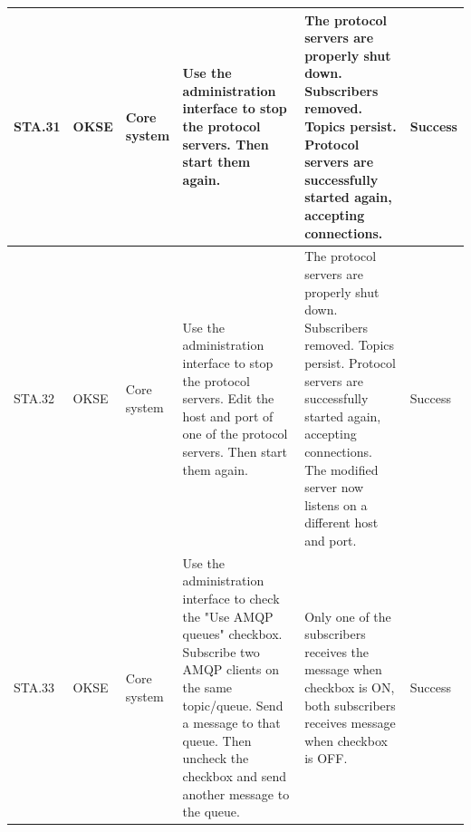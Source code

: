 \begin{table}[ht!]
\begin{tabular}{|m{0.5cm}|m{1.2cm}|m{1.2cm}|m{3.3cm}|m{3.3cm}|m{1.5cm}|}
STA.31 & OKSE & Core system & Use the administration interface to stop the protocol servers. Then start them again. & The protocol servers are properly shut down. Subscribers removed. Topics persist. Protocol servers are successfully started again, accepting connections. & Success \\ \hline
STA.32 & OKSE & Core system & Use the administration interface to stop the protocol servers. Edit the host and port of one of the protocol servers. Then start them again. & The protocol servers are properly shut down. Subscribers removed. Topics persist. Protocol servers are successfully started again, accepting connections. The modified server now listens on a different host and port. & Success \\ \hline
STA.33 & OKSE & Core system & Use the administration interface to check the "Use AMQP queues" checkbox. Subscribe two AMQP clients on the same topic/queue. Send a message to that queue. Then uncheck the checkbox and send another message to the queue. & Only one of the subscribers receives the message when checkbox is ON, both subscribers receives message when checkbox is OFF. & Success \\ \hline
\end{tabular}
\end{table}

\clearpage

